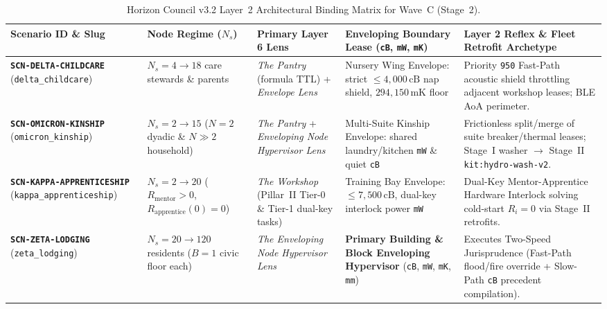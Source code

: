 \begin{table}[htbp]
\centering
\caption{Horizon Council v3.2 Layer~2 Architectural Binding Matrix for Wave~C (Stage~2).}
\label{tab:l2-wave-c-matrix}
\footnotesize
\begin{tabular}{@{}p{2.5cm}p{2.1cm}p{2.9cm}p{3.0cm}p{3.2cm}@{}}
\toprule
\textbf{Scenario ID \& Slug} & \textbf{Node Regime ($N_s$)} & \textbf{Primary Layer 6 Lens} & \textbf{Enveloping Boundary Lease (\texttt{cB}, \texttt{mW}, \texttt{mK})} & \textbf{Layer 2 Reflex \& Fleet Retrofit Archetype} \\
\midrule
\textbf{\texttt{SCN-DELTA-CHILDCARE}} (\texttt{delta\_childcare}) & $N_s = 4 \to 18$ care stewards \& parents & \textit{The Pantry} (formula TTL) + \textit{Envelope Lens} & Nursery Wing Envelope: strict $\le 4{,}000\,\mathrm{cB}$ nap shield, $294{,}150\,\mathrm{mK}$ floor & Priority \texttt{950} Fast-Path acoustic shield throttling adjacent workshop leases; BLE AoA perimeter. \\
\addlinespace[3pt]
\textbf{\texttt{SCN-OMICRON-KINSHIP}} (\texttt{omicron\_kinship}) & $N_s = 2 \to 15$ ($N=2$ dyadic \& $N \gg 2$ household) & \textit{The Pantry} + \textit{Enveloping Node Hypervisor Lens} & Multi-Suite Kinship Envelope: shared laundry/kitchen \texttt{mW} \& quiet \texttt{cB} & Frictionless split/merge of suite breaker/thermal leases; Stage~I washer $\to$ Stage~II \texttt{kit:hydro-wash-v2}. \\
\addlinespace[3pt]
\textbf{\texttt{SCN-KAPPA-APPRENTICESHIP}} (\texttt{kappa\_apprenticeship}) & $N_s = 2 \to 20$ ($R_{\mathrm{mentor}} > 0$, $R_{\mathrm{apprentice}}(0) = 0$) & \textit{The Workshop} (Pillar~II Tier-0 \& Tier-1 dual-key tasks) & Training Bay Envelope: $\le 7{,}500\,\mathrm{cB}$, dual-key interlock power \texttt{mW} & Dual-Key Mentor-Apprentice Hardware Interlock solving cold-start $R_i=0$ via Stage~II retrofits. \\
\addlinespace[3pt]
\textbf{\texttt{SCN-ZETA-LODGING}} (\texttt{zeta\_lodging}) & $N_s = 20 \to 120$ residents ($B=1$ civic floor each) & \textit{The Enveloping Node Hypervisor Lens} & \textbf{Primary Building \& Block Enveloping Hypervisor} (\texttt{cB}, \texttt{mW}, \texttt{mK}, \texttt{mm}) & Executes Two-Speed Jurisprudence (Fast-Path flood/fire override + Slow-Path \texttt{cB} precedent compilation). \\
\bottomrule
\end{tabular}
\end{table}


